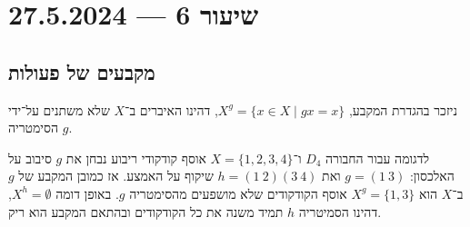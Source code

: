 \section{שיעור 6 --- 27.5.2024}
\subsection{מקבעים של פעולות}
ניזכר בהגדרת המקבע, $X^g = \{ x \in X \mid gx = x \}$, דהינו האיברים ב־$X$ שלא משתנים על־ידי הסימטריה $g$.

לדגומה עבור החבורה $D_4$ ו־$X = \{1, 2, 3, 4\}$ אוסף קודקודי ריבוע נבחן את $g$ סיבוב על האלכסון: $g = (1\ 3)$ ואת $h = (1\ 2)(3\ 4)$ שיקוף על האמצע.
אז כמובן המקבע של $g$ ב־$X$ הוא $X^g = \{1, 3\}$ אוסף הקודקודים שלא מושפעים מהסימטריה $g$.
באופן דומה $X^h = \emptyset$, דהינו הסמיטריה $h$ תמיד משנה את כל הקודקודים ובהתאם המקבע הוא ריק.

